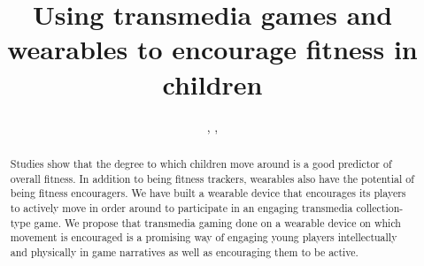 \documentclass{SIGCHI2015LaTex/sigchi}
\begin{document}
\title{Using transmedia games and wearables to encourage fitness in children}


\author{
, 
,
}





\maketitle

\begin{abstract}

Studies show that the degree to which children move around is a good predictor of overall fitness. In addition to being fitness trackers, wearables also have the potential of being fitness encouragers. We have built a wearable device that encourages its players to actively move in order around to participate in an engaging transmedia collection-type game. We propose that transmedia gaming done on a wearable device on which movement is encouraged is a promising way of engaging young players intellectually and physically in game narratives as well as encouraging them to be active. 

\end{abstract}
\end{document}
